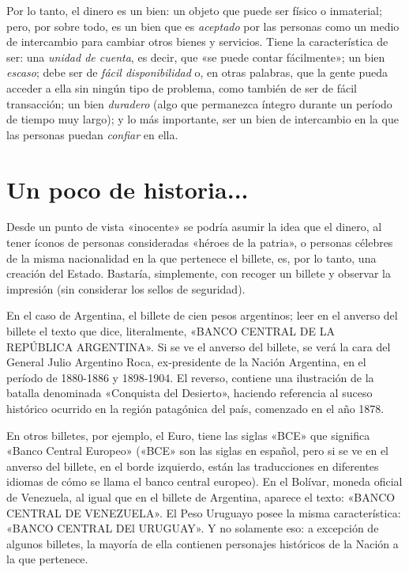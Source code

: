 \documentclass[12pt,a4paper,twoside]{book}
\begin{document}
Por lo tanto, el dinero es un bien: un objeto que puede ser físico o inmaterial; pero, por sobre todo, es un bien que es \textit{aceptado} por las personas como un medio de intercambio para cambiar otros bienes y servicios. Tiene la característica de ser: una \textit{unidad de cuenta}, es decir, que «se puede contar fácilmente»; un bien \textit{escaso}; debe ser de \textit{fácil disponibilidad} o, en otras palabras, que la gente pueda acceder a ella sin ningún tipo de problema, como también de ser de fácil transacción; un bien \textit{duradero} (algo que permanezca íntegro durante un período de tiempo muy largo); y lo más importante, ser un bien de intercambio en la que las personas puedan \textit{confiar} en ella.

\section{Un poco de historia...}
Desde un punto de vista «inocente» se podría asumir la idea que el dinero, al tener íconos de personas consideradas «héroes de la patria», o personas célebres de la misma nacionalidad en la que pertenece el billete, es, por lo tanto, una creación del Estado. Bastaría, simplemente, con recoger un billete y observar la impresión (sin considerar los sellos de seguridad).

En el caso de Argentina, el billete de cien pesos argentinos; leer en el anverso del billete el texto que dice, literalmente, «BANCO CENTRAL DE LA REPÚBLICA ARGENTINA». Si se ve el anverso del billete, se verá la cara del General Julio Argentino Roca, ex-presidente de la Nación Argentina, en el período de 1880-1886 y 1898-1904. El reverso, contiene una ilustración de la batalla denominada «Conquista del Desierto», haciendo referencia al suceso histórico ocurrido en la región patagónica del país, comenzado en el año 1878. 

En otros billetes, por ejemplo, el Euro, tiene las siglas «BCE» que significa «Banco Central Europeo» («BCE» son las siglas en español, pero si se ve en el anverso del billete, en el borde izquierdo, están las traducciones en diferentes idiomas de cómo se llama el banco central europeo). En el Bolívar, moneda oficial de Venezuela, al igual que en el billete de Argentina, aparece el texto: «BANCO CENTRAL DE VENEZUELA». El Peso Uruguayo posee la misma característica: «BANCO CENTRAL DEl URUGUAY». Y no solamente eso: a excepción de algunos billetes, la mayoría de ella contienen personajes históricos de la Nación a la que pertenece.
\end{document}
